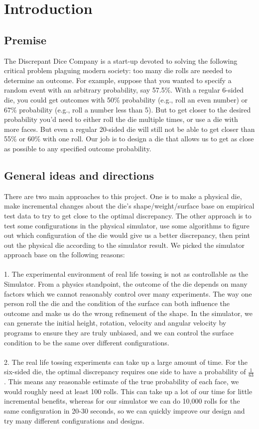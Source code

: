 \section{Introduction}
\subsection{Premise}
The Discrepant Dice Company is a start-up devoted to solving the following critical problem plaguing modern society: too many die rolls are needed to determine an outcome. For example, suppose that you wanted to specify a random event with an arbitrary probability, say 57.5\%. With a regular 6-sided die, you could get outcomes with 50\% probability (e.g., roll an even number) or 67\% probability (e.g., roll a number less than 5). But to get closer to the desired probability you'd need to either roll the die multiple times, or use a die with more faces. But even a regular 20-sided die will still not be able to get closer than 55\% or 60\% with one roll. Our job is to design a die that allows us to get as close as possible to any specified outcome probability.

\subsection{General ideas and directions}
There are two main approaches to this project. One is to make a physical die, make incremental changes about the die's shape/weight/surface base on empirical test data to try to get close to the optimal discrepancy.
The other approach is to test some configurations in the physical simulator, use some algorithms to figure out which configuration of the die would give us a better discrepancy, then print out the physical die according to the simulator result. 
We picked the simulator approach base on the following reasons:\\\\
1. The experimental environment of real life tossing is not as controllable as the Simulator. From a physics standpoint, the outcome of the die depends on many factors which we cannot reasonably control over many experiments. The way one person roll the die and the condition of the surface can both influence the outcome and make us do the wrong refinement of the shape. In the simulator, we can generate the initial height, rotation, velocity and angular velocity by programs to ensure they are truly unbiased, and we can control the surface condition to be the same over different configurations.\\\\
2. The real life tossing experiments can take up a large amount of time. For the six-sided die, the optimal discrepancy requires one side to have a probability of ${\frac{1}{63}}$. This means any reasonable estimate of the true probability of each face, we would roughly need at least 100 rolls. This can take up a lot of our time for little incremental benefits, whereas for our simulator we can do 10,000 rolls for the same configuration in 20-30 seconds, so we can quickly improve our design and try many different configurations and designs.\\
